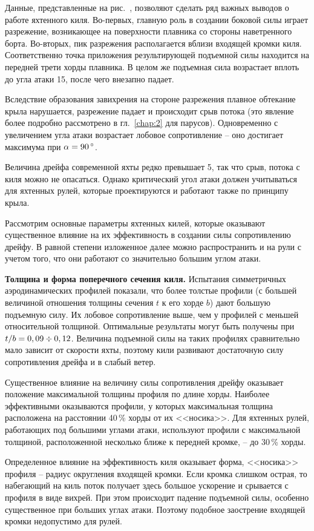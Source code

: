 Данные, представленные на рис.~, позволяют сделать ряд важных
выводов о работе яхтенного киля. Во-первых, главную роль в создании
боковой силы играет разрежение, возникающее на поверхности плавника со
стороны наветренного борта. Во-вторых, пик разрежения располагается
вблизи входящей кромки киля. Соответственно точка приложения
результирующей подъемной силы находится на передней трети хорды
плавника. В целом же подъемная сила возрастает вплоть до угла атаки
15\gr, после чего внезапно падает.

Вследствие образования завихрения на стороне разрежения плавное
обтекание крыла нарушается, разрежение падает и происходит срыв потока
(это явление более подробно рассмотрено в гл.~\ref{chap:2} для
парусов). Одновременно с увеличением угла атаки возрастает лобовое
сопротивление \--- оно достигает максимума при $\alpha = 90\,^\circ$.

Величина дрейфа современной яхты редко превышает 5\gr, так что срыв,
потока с киля можно не опасаться. Однако критический угол атаки должен
учитываться для яхтенных рулей, которые проектируются и работают также
по принципу крыла.

Рассмотрим основные параметры яхтенных килей, которые оказывают
существенное влияние на их эффективность в создании силы сопротивлению
дрейфу. В равной степени изложенное далее можно распространить и на
рули с учетом того, что они работают со значительно большим углом
атаки.

\textbf{Толщина и форма поперечного сечения киля.} Испытания
симметричных аэродинамических профилей показали, что более толстые
профили (с большей величиной отношения толщины сечения $t$ к его хорде
$b$) дают большую подъемную силу. Их лобовое сопротивление выше, чем у
профилей с меньшей относительной толщиной. Оптимальные результаты
могут быть получены при $t/b = 0,09 \div 0,12$. Величина подъемной
силы на таких профилях сравнительно мало зависит от скорости яхты,
поэтому кили развивают достаточную силу сопротивления дрейфа и в
слабый ветер.

Существенное влияние на величину силы сопротивления дрейфу оказывает
положение максимальной толщины профиля по длине хорды. Наиболее
эффективными оказываются профили, у которых максимальная толщина
расположена на расстоянии 40\,\% хорды от их <<носика>>. Для
яхтенных рулей, работающих под большими углами атаки, используют
профили с максимальной толщиной, расположенной несколько ближе к
передней кромке, \--- до 30\,\% хорды.

Определенное влияние на эффективность киля оказывает форма, <<носика>>
профиля \--- радиус округления входящей кромки. Если кромка слишком
острая, то набегающий на киль поток получает здесь большое ускорение и
срывается с профиля в виде вихрей. При этом происходит падение
подъемной силы, особенно существенное при больших углах атаки. Поэтому
подобное заострение входящей кромки недопустимо для рулей.

